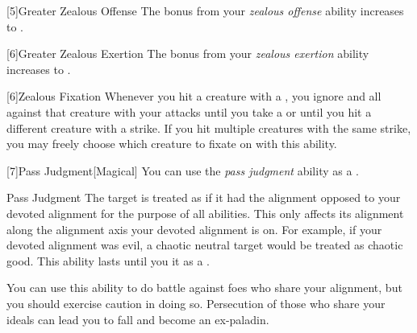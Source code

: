         [5]{Greater Zealous Offense} The bonus from your \textit{zealous offense} ability increases to .

        [6]{Greater Zealous Exertion} The bonus from your \textit{zealous exertion} ability increases to .

        [6]{Zealous Fixation} Whenever you hit a creature with a , you ignore  and all  against that creature with your attacks until you take a  or until you hit a different creature with a strike.
        If you hit multiple creatures with the same strike, you may freely choose which creature to fixate on with this ability.

        [7]{Pass Judgment}[Magical] You can use the \textit{pass judgment} ability as a .
        \begin{freeability}{Pass Judgment}
            The target is treated as if it had the alignment opposed to your devoted alignment for the purpose of all abilities.
            This only affects its alignment along the alignment axis your devoted alignment is on.
            For example, if your devoted alignment was evil, a chaotic neutral target would be treated as chaotic good.
            This ability lasts until you  it as a .

            You can use this ability to do battle against foes who share your alignment, but you should exercise caution in doing so.
            Persecution of those who share your ideals can lead you to fall and become an ex-paladin.
        \end{freeability}


